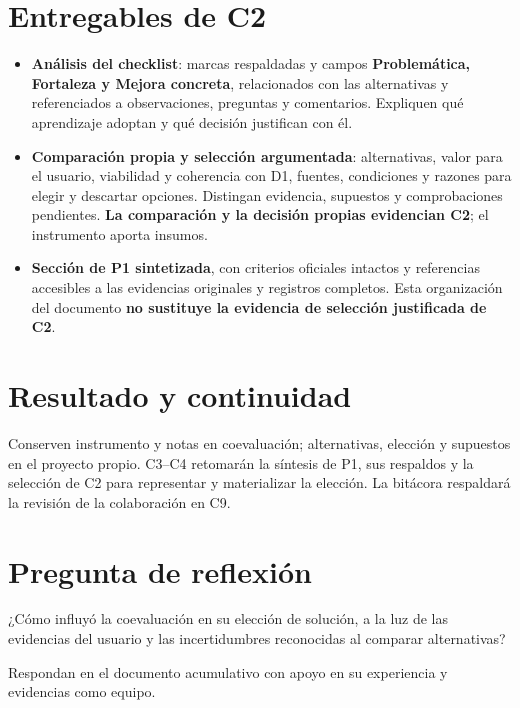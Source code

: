 \section*{Entregables de C2}
\begin{itemize}
\item \textbf{Análisis del checklist}: marcas respaldadas y campos \textbf{Problemática, Fortaleza y Mejora concreta}, relacionados con las alternativas y referenciados a observaciones, preguntas y comentarios. Expliquen qué aprendizaje adoptan y qué decisión justifican con él.
\item \textbf{Comparación propia y selección argumentada}: alternativas, valor para el usuario, viabilidad y coherencia con D1, fuentes, condiciones y razones para elegir y descartar opciones. Distingan evidencia, supuestos y comprobaciones pendientes. \textbf{La comparación y la decisión propias evidencian C2}; el instrumento aporta insumos.
\item \textbf{Sección de P1 sintetizada}, con criterios oficiales intactos y referencias accesibles a las evidencias originales y registros completos. Esta organización del documento \textbf{no sustituye la evidencia de selección justificada de C2}.
\end{itemize}

\section*{Resultado y continuidad}
Conserven instrumento y notas en coevaluación; alternativas, elección y supuestos en el proyecto propio. C3--C4 retomarán la síntesis de P1, sus respaldos y la selección de C2 para representar y materializar la elección. La bitácora respaldará la revisión de la colaboración en C9.

\section*{Pregunta de reflexión}
¿Cómo influyó la coevaluación en su elección de solución, a la luz de las evidencias del usuario y las incertidumbres reconocidas al comparar alternativas?

Respondan en el documento acumulativo con apoyo en su experiencia y evidencias como equipo.



